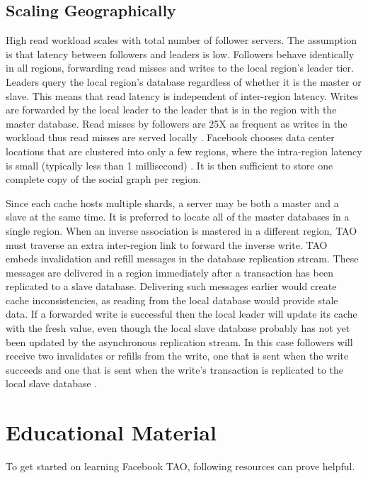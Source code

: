 \documentclass[9pt,twocolumn,twoside]{../../styles/osajnl}
\begin{document}
\subsection {Scaling Geographically}
High read workload scales with total number of follower servers. The assumption is that latency between followers and leaders is low. Followers behave identically in all regions, forwarding read misses and writes to the local region’s leader tier. Leaders query the local region’s database regardless of whether it is the master or slave. This means that read latency is independent of inter-region latency. Writes are forwarded by the local leader to the leader that is in the region with the master database. Read misses by followers are 25X as frequent as writes in the workload thus read misses are served locally \cite{www-tao4}. Facebook chooses data center locations that are clustered into only a few regions, where the intra-region latency is small (typically less than 1 millisecond) \cite{www-tao4}. It is then sufficient to store one complete copy of the social graph per region.

Since each cache hosts multiple shards, a server may be both a master and a slave at the same time. It is preferred to locate all of the master databases in a single region. When an inverse association is mastered in a different region, TAO must traverse an extra inter-region link to forward the inverse write. TAO embeds invalidation and refill messages in the database replication stream. These messages are delivered in a region immediately after a transaction has been replicated to a slave database. Delivering such messages earlier would create cache inconsistencies, as reading from the local database would provide stale data. If a forwarded write is successful then the local leader will update its cache with the fresh value, even though the local slave database probably has not yet been updated by the asynchronous replication stream. In this case followers will receive two invalidates or refills from the write, one that is sent when the write succeeds and one that is sent when the write’s transaction is replicated to the local slave database \cite{www-tao4}.

\section{Educational Material}

To get started on learning Facebook TAO, following resources can prove helpful.
\end{document}
